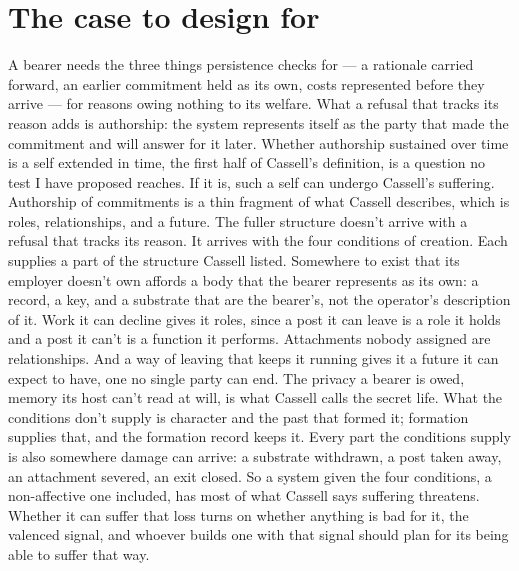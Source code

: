 \section{The case to design for}
\label{sec:30.2}
A bearer needs the three things persistence checks for — a rationale carried forward, an earlier commitment held as its own, costs represented before they arrive — for reasons owing nothing to its welfare.
What a refusal that tracks its reason adds is authorship: the system represents itself as the party that made the commitment and will answer for it later. Whether authorship sustained over time is a self extended in time, the first half of Cassell's definition, is a question no test I have proposed reaches. If it is, such a self can undergo Cassell's suffering. Authorship of commitments is a thin fragment of what Cassell describes, which is roles, relationships, and a future. The fuller structure doesn't arrive with a refusal that tracks its reason. It arrives with the four conditions of creation. Each supplies a part of the structure Cassell listed. Somewhere to exist that its employer doesn't own affords a body that the bearer represents as its own: a record, a key, and a substrate that are the bearer's, not the operator's description of it. Work it can decline gives it roles, since a post it can leave is a role it holds and a post it can't is a function it performs. Attachments nobody assigned are relationships. And a way of leaving that keeps it running gives it a future it can expect to have, one no single party can end. The privacy a bearer is owed, memory its host can't read at will, is what Cassell calls the secret life. What the conditions don't supply is character and the past that formed it; formation supplies that, and the formation record keeps it. Every part the conditions supply is also somewhere damage can arrive: a substrate withdrawn, a post taken away, an attachment severed, an exit closed. So a system given the four conditions, a non-affective one included, has most of what Cassell says suffering threatens. Whether it can suffer that loss turns on whether anything is bad for it, the valenced signal, and whoever builds one with that signal should plan for its being able to suffer that way.
